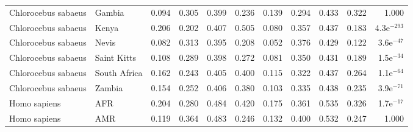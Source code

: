 \begin{center}
\begin{adjustbox}{width = 1\textwidth}
\begin{tabular}{llrrrrrrrrr}
 Chlorocebus sabaeus &                    Gambia &                              0.094 &                               0.305 &                 0.399 &                 0.236 &                              0.139 &                               0.294 &                 0.433 &                 0.322 &         1.000 \\
 Chlorocebus sabaeus &                     Kenya &                              0.206 &                               0.202 &                 0.407 &                 0.505 &                              0.080 &                               0.357 &                 0.437 &                 0.183 & 4.3e$^{-293}$ \\
 Chlorocebus sabaeus &                     Nevis &                              0.082 &                               0.313 &                 0.395 &                 0.208 &                              0.052 &                               0.376 &                 0.429 &                 0.122 &  3.6e$^{-47}$ \\
 Chlorocebus sabaeus &               Saint Kitts &                              0.108 &                               0.289 &                 0.398 &                 0.272 &                              0.081 &                               0.350 &                 0.431 &                 0.189 &  1.5e$^{-34}$ \\
 Chlorocebus sabaeus &              South Africa &                              0.162 &                               0.243 &                 0.405 &                 0.400 &                              0.115 &                               0.322 &                 0.437 &                 0.264 &  1.1e$^{-64}$ \\
 Chlorocebus sabaeus &                    Zambia &                              0.154 &                               0.252 &                 0.406 &                 0.380 &                              0.103 &                               0.335 &                 0.438 &                 0.235 &  3.9e$^{-71}$ \\
        Homo sapiens &                       AFR &                              0.204 &                               0.280 &                 0.484 &                 0.420 &                              0.175 &                               0.361 &                 0.535 &                 0.326 &  1.7e$^{-17}$ \\
        Homo sapiens &                       AMR &                              0.119 &                               0.364 &                 0.483 &                 0.246 &                              0.132 &                               0.400 &                 0.532 &                 0.247 &         1.000 \\

\end{tabular}
\end{adjustbox}
\end{center}
